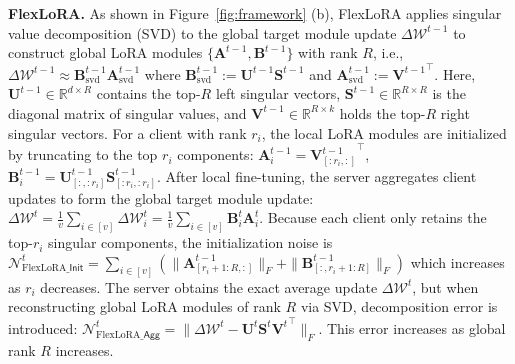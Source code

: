 \documentclass{article} %
\newcommand{\Init}{\mathsf{Init}}
\newcommand{\Agg}{\mathsf{Agg}}
\begin{document}


\textbf{FlexLoRA.} 
As shown in Figure~\ref{fig:framework} (b), FlexLoRA applies singular value decomposition (SVD) to the global target module update $\Delta\boldsymbol{\mathcal{W}}^{t-1}$ to construct global LoRA modules $\{\mathbf{A}^{t-1}, \mathbf{B}^{t-1}\}$ with rank $R$, i.e., $\Delta\boldsymbol{\mathcal{W}}^{t-1} \approx \mathbf{B}_{\text{svd}}^{t-1} \mathbf{A}_{\text{svd}}^{t-1} $ where $\mathbf{B}_{\text{svd}}^{t-1} := \mathbf{U}^{t-1} \mathbf{S}^{t-1}$ and $\mathbf{A}_{\text{svd}}^{t-1} := {\mathbf{V}^{t-1}}^\top$. Here, $\mathbf{U}^{t-1} \in\mathbb{R}^{d\times R}$ contains the top-$R$ left singular vectors, $\mathbf{S}^{t-1}\in\mathbb{R}^{R\times R}$ is the diagonal matrix of singular values, and $\mathbf{V}^{t-1}\in\mathbb{R}^{R\times k}$ holds the top-$R$ right singular vectors. For a client with rank $r_i$, the local LoRA modules are initialized by truncating to the top $r_i$ components: $\mathbf{A}^{t-1}_i={\mathbf{V}^{t-1}_{[:r_i, :]}}^\top$, $\mathbf{B}^{t-1}_i=\mathbf{U}^{t-1}_{[:,:r_i]}\mathbf{S}^{t-1}_{[:r_i,:r_i]}$. After local fine-tuning, the server aggregates client updates to form the global target module update: $\Delta\boldsymbol{\mathcal{W}}^t=\frac{1}{v}\sum_{i\in [v]}\Delta\boldsymbol{\mathcal{W}}_i^t=\frac{1}{v}\sum_{i\in [v]}\mathbf{B}_i^{t}\mathbf{A}_i^{t}$. Because each client only retains the top-$r_i$ singular components, the initialization noise is $\mathcal{N}_{\text{FlexLoRA\_}\Init}^{t}  = \sum_{i\in[v]} ( \|{\mathbf{A}^{t-1}_{[r_i+1:R,:]}}\|_F + \|{\mathbf{B}}^{t-1}_{[:,r_i+1:R]}\|_F)$ which increases as $r_i$ decreases. The server obtains the exact average update $\Delta\boldsymbol{\mathcal{W}}^t$, but when reconstructing global LoRA modules of rank $R$ via SVD, decomposition error is introduced: $ \mathcal{N}_{\text{FlexLoRA\_}\Agg}^{t} = \| \Delta {\boldsymbol{\mathcal{W}}}^{t} -  \mathbf{U}^{t} \mathbf{S}^{t} {\mathbf{V}^{t}}^\top\|_F$. 
This error increases as global rank $R$ increases. 
\end{document}
